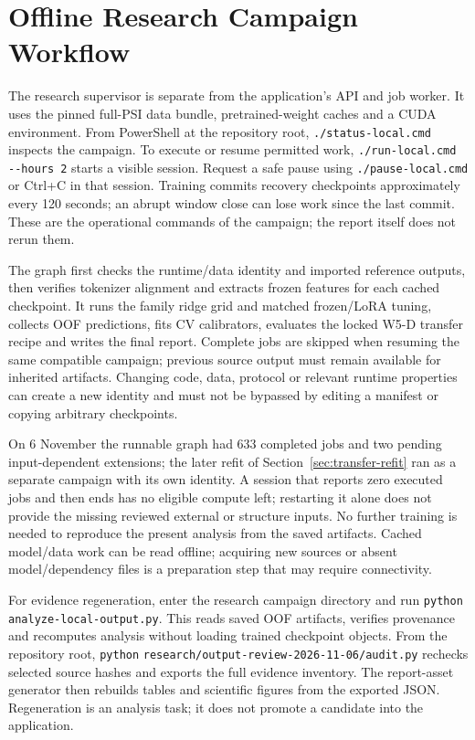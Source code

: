 \section{Offline Research Campaign Workflow}\label{sec:research-local-guide}
The research supervisor is separate from the application's API and job worker. It uses the pinned
full-PSI data bundle, pretrained-weight caches and a CUDA environment. From PowerShell at the
repository root, \nolinkurl{./status-local.cmd} inspects the campaign. To execute or resume permitted
work, \texttt{./run-local.cmd -{}-hours 2} starts a visible session. Request a safe pause using
\nolinkurl{./pause-local.cmd} or Ctrl+C in that session. Training commits recovery checkpoints
approximately every 120 seconds; an abrupt window close can lose work since the last commit.
These are the operational commands of the campaign; the report itself does not rerun them.

The graph first checks the runtime/data identity and imported reference outputs, then verifies
tokenizer alignment and extracts frozen features for each cached checkpoint. It runs the family ridge
grid and matched frozen/LoRA tuning, collects OOF predictions, fits CV calibrators, evaluates the
locked W5-D transfer recipe and writes the final report. Complete jobs are skipped when resuming
the same compatible campaign; previous source output must remain available for inherited artifacts.
Changing code, data, protocol or relevant runtime properties can create a new identity and must not
be bypassed by editing a manifest or copying arbitrary checkpoints.

On 6 November the runnable graph had 633 completed jobs and two pending input-dependent
extensions; the later refit of Section~\ref{sec:transfer-refit} ran as a separate campaign with its own
identity. A session that reports zero executed jobs and then ends has no eligible compute left;
restarting it alone does not provide the missing reviewed external or structure inputs. No further
training is needed to reproduce the present analysis from the saved artifacts. Cached model/data
work can be read offline; acquiring new sources or absent model/dependency files is a preparation
step that may require connectivity.

For evidence regeneration, enter the research campaign directory and run
\texttt{python analyze-local-output.py}. This reads saved OOF artifacts, verifies provenance and
recomputes analysis without loading trained checkpoint objects. From the repository root,
\texttt{python} \nolinkurl{research/output-review-2026-11-06/audit.py}
rechecks selected source hashes and exports the full evidence inventory. The report-asset generator
then rebuilds tables and scientific figures from the exported JSON. Regeneration is an analysis task;
it does not promote a candidate into the application.

